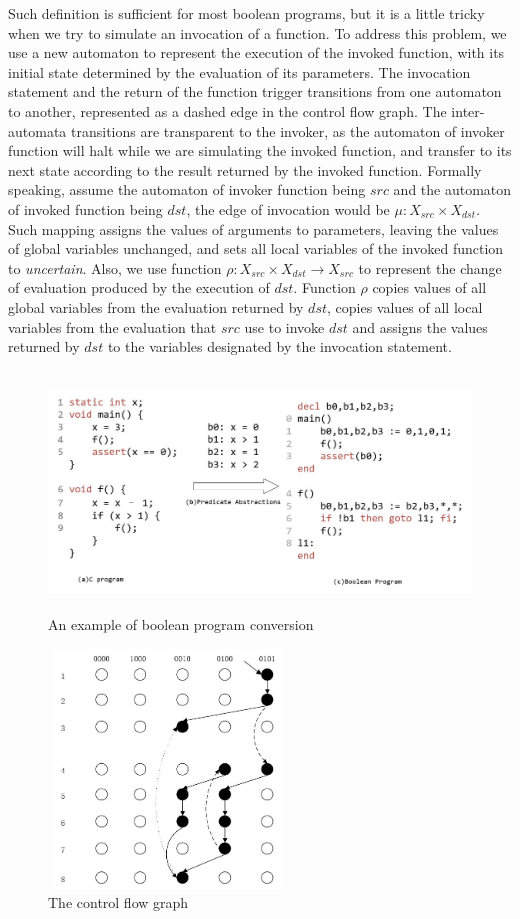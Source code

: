 Such definition is sufficient for most boolean programs, but it is a little tricky when we try to simulate an invocation of a function.
To address this problem, we use a new automaton to represent the execution of the invoked function, with its initial state determined by the evaluation of its parameters.
The invocation statement and the return of the function trigger transitions from one automaton to another, represented as a dashed edge in the control flow graph.
The inter-automata transitions are transparent to the invoker, as the automaton of invoker function will halt while we are simulating the invoked function, and transfer to its next state according to the result returned by the invoked function.
Formally speaking, assume the automaton of invoker function being $src$ and the automaton of invoked function being $dst$, the edge of invocation would be $\mu:X_{src}\times X_{dst}$. Such mapping assigns the values of arguments to parameters, leaving the values of global variables unchanged, and sets all local variables of the invoked function to {\it uncertain}. Also, we use function $\rho:X_{src}\times X_{dst} \to X_{src}$ to represent the change of evaluation produced by the execution of $dst$. Function $\rho$ copies values of all global variables from the evaluation returned by $dst$, copies values of all local variables from the evaluation that $src$ use to invoke $dst$ and assigns the values returned by $dst$ to the variables designated by the invocation statement.

\begin{figure}
\centering
\includegraphics[width=5in,height=2.5in]{Fig2-1.jpg}
\caption{An example of boolean program conversion}
\label{fig:BPC}
\end{figure}

\begin{figure}
\centering
\includegraphics[width=2.5in,height=2.5in]{Fig2-2.jpg}
\caption{The control flow graph}
\label{fig:CFG}
\end{figure}

